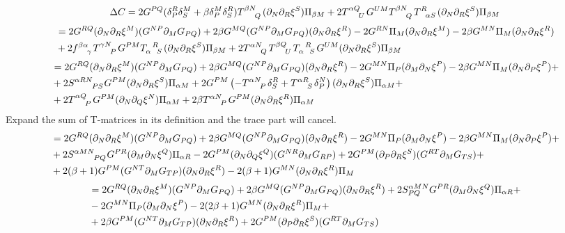 \documentclass{article}
\begin{document}
\newpage 
\begin{equation}
\Delta C = 2G^{PQ}(\delta^R_P\delta^M_S+\beta\delta^M_P\delta^R_S)\tensor{T}{^\beta^N_Q}(\pd_N\pd_R\xi^S)\Pi_{\beta M}+2\tensor{T}{^\alpha ^Q_U}G^{UM}\tensor{T}{^\beta ^N_Q}\tensor{T}{^R_\alpha _S}(\pd_N\pd_R\xi^S)\Pi_{\beta M}
\end{equation}
\begin{align*}
    &= 2G^{RQ}(\pd_N\pd_R\xi^M)(G^{NP}\pd_MG_{PQ})+2\beta G^{MQ}(G^{NP}\pd_M G_{PQ})(\pd_N\pd_R\xi^R)-2G^{RN}\Pi_M(\pd_N\pd_R\xi^M)-2\beta G^{MN}\Pi_M(\pd_N\pd_R\xi^R)\\
    &+2\tensor{f}{^{\beta\alpha}_\gamma}\tensor{T}{^{\gamma N}_P}G^{PM}\tensor{T}{_\alpha^R_S}(\pd_N\pd_R\xi^S)\Pi_{\beta M}+2\tensor{T}{^{\alpha N}_Q}\tensor{T}{^{\beta Q}_U}\tensor{T}{_\alpha^{R}_S}G^{UM}(\pd_N\pd_R\xi^S)\Pi_{\beta M}
\end{align*}
\begin{align*}
    &= 2G^{RQ}(\pd_N\pd_R\xi^M)(G^{NP}\pd_MG_{PQ})+2\beta G^{MQ}(G^{NP}\pd_M G_{PQ})(\pd_N\pd_R\xi^R)-2G^{MN}\Pi_P(\pd_M\pd_N\xi^P)-2\beta G^{MN}\Pi_M(\pd_N\pd_P\xi^P)+\\
    &+2\tensor{S}{^{\alpha RN}_P_S}G^{PM}(\pd_N\pd_R\xi^S)\Pi_{\alpha M}+2G^{PM}\left(-\tensor{T}{^\alpha ^N_P}\delta^R_S+\tensor{T}{^\alpha ^R_S}\delta^N_P\right)(\pd_N\pd_R\xi^S)\Pi_{\alpha M}+\\
    &+2\tensor{T}{^\alpha ^Q_P}G^{PM}(\pd_N\pd_Q\xi^N)\Pi_{\alpha M}+2\beta \tensor{T}{^\alpha ^N_P}G^{PM}(\pd_N\pd_R\xi^R)\Pi_{\alpha M}
\end{align*}
Expand the sum of T-matrices in its definition and the trace part will cancel. 
\begin{align*}
    &=2G^{RQ}(\pd_N\pd_R\xi^M)(G^{NP}\pd_MG_{PQ})+2\beta G^{MQ}(G^{NP}\pd_M G_{PQ})(\pd_N\pd_R\xi^R)-2G^{MN}\Pi_P(\pd_M\pd_N\xi^P)-2\beta G^{MN}\Pi_M(\pd_N\pd_P\xi^P)+\\
    &+2\tensor{S}{^{\alpha MN}_{PQ}}G^{PR}(\pd_M\pd_N\xi^Q)\Pi_{\alpha R}-2G^{PM}(\pd_N\pd_Q\xi^Q)(G^{NR}\pd_M G_{RP})+2G^{PM}(\pd_P\pd_R\xi^S)(G^{RT}\pd_M G_{TS})+\\
    &+2(\beta+1)G^{PM}(G^{NT}\pd_M G_{TP})(\pd_N\pd_R\xi^R)-2(\beta+1)G^{MN}(\pd_N\pd_R\xi^R)\Pi_M
\end{align*}
\begin{align*}
    &=2G^{RQ}(\partial_N\partial_R\xi^M)(G^{NP}\partial_MG_{PQ})+2\beta G^{MQ}(G^{NP}\partial_M G_{PQ})(\partial_N\partial_R\xi^R)+2S^{\alpha MN}_{PQ}G^{PR}(\partial_M\partial_N\xi^Q)\Pi_{\alpha R}+\\
    &-2G^{MN}\Pi_P(\partial_M\partial_N\xi^P)-2(2\beta+1)G^{MN}(\partial_N\partial_R\xi^R)\Pi_M+\\
    &+2\beta G^{PM}(G^{NT}\partial_M G_{TP})(\partial_N\partial_R\xi^R)+2G^{PM}(\partial_P\partial_R\xi^S)(G^{RT}\partial_M G_{TS})
\end{align*}
\end{document}
